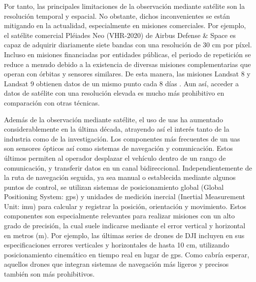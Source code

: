 Por tanto, las principales limitaciones de la observación mediante satélite son la resolución temporal y espacial. No obstante, dichos inconvenientes se están mitigando en la actualidad, especialmente en misiones comerciales. Por ejemplo, el satélite comercial Pléiades Neo (VHR-2020) de Airbus Defense \& Space \cite{airbus_pleiades_2021} es capaz de adquirir diariamente siete bandas con una resolución de 30 \si{\centi\meter} por píxel. Incluso en misiones financiadas por entidades públicas, el periodo de repetición se reduce a menudo debido a la existencia de diversas misiones complementarias que operan con órbitas y sensores similares. De esta manera, las misiones Landsat 8 y Landsat 9 obtienen datos de un mismo punto cada 8 días \cite{masek_landsat_2020}. Aun así, acceder a datos de satélite con una resolución elevada es mucho más prohibitivo en comparación con otras técnicas.

Además de la observación mediante satélite, el uso de \acrshort{uas} ha aumentado considerablemente en la última década, atrayendo así el interés tanto de la industria como de la investigación. Los componentes más frecuentes de un \acrshort{uas} son sensores ópticos así como sistemas de navegación y comunicación. Estos últimos permiten al operador desplazar el vehículo dentro de un rango de comunicación, y transferir datos en un canal bidireccional. Independientemente de la ruta de navegación seguida, ya sea manual o establecida mediante algunos puntos de control, se utilizan sistemas de posicionamiento global (Global Positioning System: \acrshort{gps}) y unidades de medición inercial (Inertial Measurement Unit: \acrshort{imu}) para calcular y registrar la posición, orientación y movimiento. Estos componentes son especialmente relevantes para realizar misiones con un alto grado de precisión, la cual suele indicarse mediante el error vertical y horizontal en metros (\si{\meter}). Por ejemplo, las últimas series de drones de DJI incluyen en sus especificaciones errores verticales y horizontales de hasta 10 \si{\centi\meter}, utilizando posicionamiento cinemático en tiempo real en lugar de \acrshort{gps}. Como cabría esperar, aquellos drones que integran sistemas de navegación más ligeros y precisos también son más prohibitivos.    

